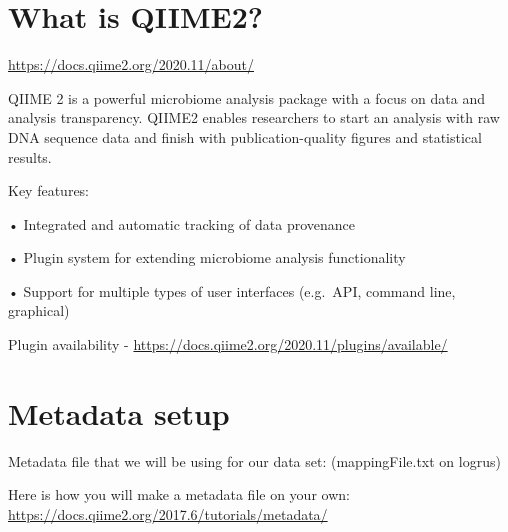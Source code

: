 \documentclass[
]{book}
\begin{document}
\hypertarget{what-is-qiime2}{%
\section{What is QIIME2?}\label{what-is-qiime2}}

\url{https://docs.qiime2.org/2020.11/about/}

QIIME 2 is a powerful microbiome analysis package with a focus on data and analysis transparency. QIIME2 enables researchers to start an analysis with raw DNA sequence data and finish with publication-quality figures and statistical results.

Key features:

• Integrated and automatic tracking of data provenance

• Plugin system for extending microbiome analysis functionality

• Support for multiple types of user interfaces (e.g.~API, command line, graphical)

Plugin availability - \url{https://docs.qiime2.org/2020.11/plugins/available/}

\hypertarget{metadata-setup}{%
\section{Metadata setup}\label{metadata-setup}}

Metadata file that we will be using for our data set: (mappingFile.txt on logrus)

Here is how you will make a metadata file on your own: \url{https://docs.qiime2.org/2017.6/tutorials/metadata/}
\end{document}
